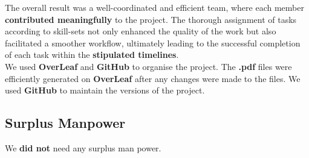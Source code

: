 The overall result was a well-coordinated and efficient team, where each member \textbf{contributed meaningfully} to the project. The thorough assignment of tasks according to skill-sets not only enhanced the quality of the work but also facilitated a smoother workflow, ultimately leading to the successful completion of each task within the \textbf{stipulated timelines}.
\\

We used \textbf{OverLeaf} and \textbf{GitHub} to organise the project. The \textbf{.pdf} files were efficiently generated on \textbf{OverLeaf} after any changes were made to the files. We used \textbf{GitHub} to maintain the versions of the project. 


\subsection{Surplus Manpower}
We \textbf{did not} need any surplus man power.
